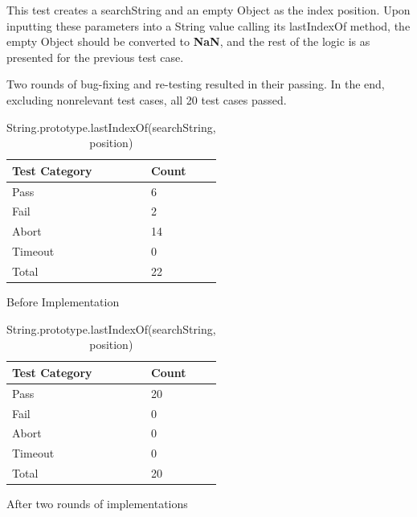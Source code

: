 \documentclass[a4paper,11pt,twoside]{report}
\begin{document}
\begin{itemize}
\begin{itemize}
This test creates a searchString and an empty Object as the index position. Upon inputting these parameters into a String value calling its lastIndexOf method, the empty Object should be converted to \textbf{NaN}, and the rest of the logic is as presented for the previous test case.
\end{itemize}
Two rounds of bug-fixing and re-testing resulted in their passing. In the end, excluding nonrelevant test cases, all 20 test cases passed.
\begin{table}[ht!]
\centering
\begin{subtable}{0.5\textwidth}
\centering
\begin{tabular}{|p{3cm}|p{2cm}|} \hline
\textbf{Test Category} & \textbf{Count} \\ \hline
Pass & 6 \\
Fail & 2 \\
Abort & 14 \\
Timeout & 0 \\
Total & 22 \\ \hline
\end{tabular}
\caption{Before Implementation}
\end{subtable}%
\begin{subtable}{0.5\textwidth}
\centering
\begin{tabular}{|p{3cm}|p{2cm}|} \hline
\textbf{Test Category} & \textbf{Count} \\ \hline
Pass & 20 \\
Fail & 0 \\
Abort & 0 \\
Timeout & 0 \\
Total & 20 \\ \hline
\end{tabular}
\caption{After two rounds of implementations}
\end{subtable}
\caption{String.prototype.lastIndexOf(searchString, position)}
\end{table}


\end{itemize}
\end{document}
